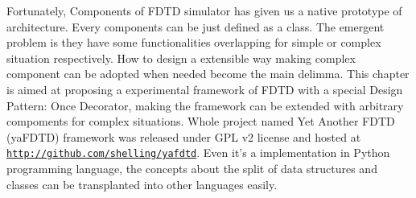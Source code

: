 Fortunately, Components of FDTD simulator has given us a native prototype of architecture. Every components can be just
defined as a class. The emergent problem is they have some functionalities overlapping for simple or complex situation
respectively. How to design a extensible way making complex component can be adopted when needed become the main
delimma. This chapter is aimed at proposing a experimental framework of FDTD with a special Design Pattern: Once
Decorator, making the framework can be extended with arbitrary compoments for complex situations. Whole project named
Yet Another FDTD (yaFDTD) framework was released under GPL v2 license and hosted at
\texttt{\url{http://github.com/shelling/yafdtd}}. Even it's a implementation in Python programming language, the
concepts about the split of data structures and classes can be transplanted into other languages easily.
